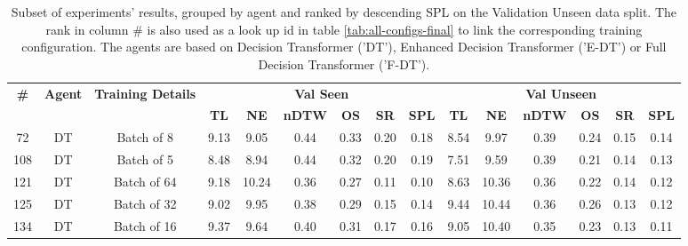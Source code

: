 \begin{table}
\centering
\caption{\label{tab:batch_test}Subset of experiments' results, grouped by agent and ranked by descending SPL on the Validation Unseen data split. The rank in column \# is also used as a look up id in table \ref{tab:all-configs-final} to link the corresponding training configuration.     \newline The agents are based on Decision Transformer ('DT'), Enhanced Decision Transformer ('E-DT') or Full Decision Transformer ('F-DT').}
\begin{tabular}{@{\hskip3pt}c@{\hskip3pt}c@{\hskip3pt}c@{\hskip3pt}c@{\hskip3pt}c@{\hskip3pt}c@{\hskip3pt}c@{\hskip3pt}c@{\hskip3pt}c@{\hskip3pt}c@{\hskip3pt}c@{\hskip3pt}c@{\hskip3pt}c@{\hskip3pt}c@{\hskip3pt}c}
\toprule
\textbf{\#} & \textbf{Agent} & \textbf{Training Details} & \multicolumn{6}{c}{\textbf{Val Seen}} & \multicolumn{6}{c}{\textbf{Val Unseen}} \\
 \textbf{~} &     \textbf{~} &                \textbf{~} &       \textbf{TL} & \textbf{NE} & \textbf{nDTW} & \textbf{OS} & \textbf{SR} & \textbf{SPL} &         \textbf{TL} & \textbf{NE} & \textbf{nDTW} & \textbf{OS} & \textbf{SR} & \textbf{SPL} \\
\midrule
         72 &             DT &                Batch of 8 &              9.13 &        9.05 &          0.44 &        0.33 &        0.20 &         0.18 &                8.54 &        9.97 &          0.39 &        0.24 &        0.15 &         0.14 \\
        108 &             DT &                Batch of 5 &              8.48 &        8.94 &          0.44 &        0.32 &        0.20 &         0.19 &                7.51 &        9.59 &          0.39 &        0.21 &        0.14 &         0.13 \\
        121 &             DT &               Batch of 64 &              9.18 &       10.24 &          0.36 &        0.27 &        0.11 &         0.10 &                8.63 &       10.36 &          0.36 &        0.22 &        0.14 &         0.12 \\
        125 &             DT &               Batch of 32 &              9.02 &        9.95 &          0.38 &        0.29 &        0.15 &         0.14 &                9.44 &       10.44 &          0.36 &        0.26 &        0.13 &         0.12 \\
        134 &             DT &               Batch of 16 &              9.37 &        9.64 &          0.40 &        0.31 &        0.17 &         0.16 &                9.05 &       10.40 &          0.35 &        0.23 &        0.13 &         0.11 \\

\end{tabular}
\end{table}
